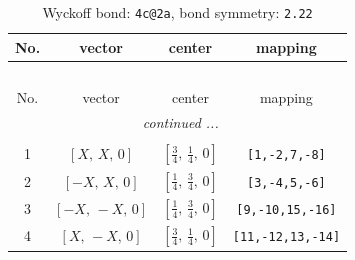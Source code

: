 \documentclass[fleqn,8pt]{jsarticle}
\begin{document}
\renewcommand{\arraystretch}{1.2}
\begin{longtable}{cccc}
\caption{Wyckoff bond: {\tt 4c@2a}, bond symmetry: {\tt 2.22}}
 \\
 \hline \hline
No. & vector & center & mapping \\ \hline \endfirsthead

\multicolumn{3}{l}{\tablename\ \thetable{}} \\
 \hline \hline
No. & vector & center & mapping \\ \hline \endhead

 \hline \hline
\multicolumn{3}{r}{\footnotesize\it continued ...} \\ \endfoot

 \hline \hline
\multicolumn{3}{r}{} \\ \endlastfoot

1 & $\left[ X,\, X,\, 0 \right]$ & $\left[ \frac{3}{4},\, \frac{1}{4},\, 0 \right]$ & {\tt [1,-2,7,-8]} \\ \hline
2 & $\left[ - X,\, X,\, 0 \right]$ & $\left[ \frac{1}{4},\, \frac{3}{4},\, 0 \right]$ & {\tt [3,-4,5,-6]} \\ \hline
3 & $\left[ - X,\, - X,\, 0 \right]$ & $\left[ \frac{1}{4},\, \frac{3}{4},\, 0 \right]$ & {\tt [9,-10,15,-16]} \\ \hline
4 & $\left[ X,\, - X,\, 0 \right]$ & $\left[ \frac{3}{4},\, \frac{1}{4},\, 0 \right]$ & {\tt [11,-12,13,-14]} \\
\end{longtable}
\renewcommand{\arraystretch}{1.2}
\end{document}
